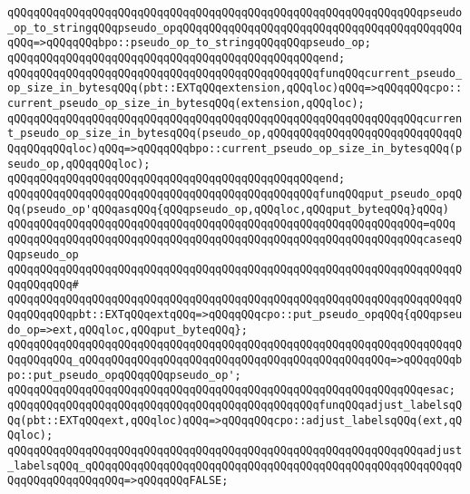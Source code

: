 \verb|qQQqqQQqqQQqqQQqqQQqqQQqqQQqqQQqqQQqqQQqqQQqqQQqqQQqqQQqqQQqqQQqpseudo_op_to_stringqQQqpseudo_opqQQqqQQqqQQqqQQqqQQqqQQqqQQqqQQqqQQqqQQqqQQqqQQq=>qQQqqQQqbpo::pseudo_op_to_stringqQQqqQQqpseudo_op;|\newline
\verb|qQQqqQQqqQQqqQQqqQQqqQQqqQQqqQQqqQQqqQQqqQQqqQQqend;|\newline
\newline
\verb|qQQqqQQqqQQqqQQqqQQqqQQqqQQqqQQqqQQqqQQqqQQqqQQqfunqQQqcurrent_pseudo_op_size_in_bytesqQQq(pbt::EXTqQQqextension,qQQqloc)qQQq=>qQQqqQQqcpo::current_pseudo_op_size_in_bytesqQQq(extension,qQQqloc);|\newline
\verb|qQQqqQQqqQQqqQQqqQQqqQQqqQQqqQQqqQQqqQQqqQQqqQQqqQQqqQQqqQQqqQQqcurrent_pseudo_op_size_in_bytesqQQq(pseudo_op,qQQqqQQqqQQqqQQqqQQqqQQqqQQqqQQqqQQqqQQqloc)qQQq=>qQQqqQQqbpo::current_pseudo_op_size_in_bytesqQQq(pseudo_op,qQQqqQQqloc);|\newline
\verb|qQQqqQQqqQQqqQQqqQQqqQQqqQQqqQQqqQQqqQQqqQQqqQQqend;|\newline
\newline
\verb|qQQqqQQqqQQqqQQqqQQqqQQqqQQqqQQqqQQqqQQqqQQqqQQqfunqQQqput_pseudo_opqQQq(pseudo_op'qQQqasqQQq{qQQqpseudo_op,qQQqloc,qQQqput_byteqQQq}qQQq)|\newline
\verb|qQQqqQQqqQQqqQQqqQQqqQQqqQQqqQQqqQQqqQQqqQQqqQQqqQQqqQQqqQQqqQQq=qQQq|\newline
\verb|qQQqqQQqqQQqqQQqqQQqqQQqqQQqqQQqqQQqqQQqqQQqqQQqqQQqqQQqqQQqqQQqcaseqQQqpseudo_op|\newline
\verb|qQQqqQQqqQQqqQQqqQQqqQQqqQQqqQQqqQQqqQQqqQQqqQQqqQQqqQQqqQQqqQQqqQQqqQQqqQQqqQQq#|\newline
\verb|qQQqqQQqqQQqqQQqqQQqqQQqqQQqqQQqqQQqqQQqqQQqqQQqqQQqqQQqqQQqqQQqqQQqqQQqqQQqqQQqpbt::EXTqQQqextqQQq=>qQQqqQQqcpo::put_pseudo_opqQQq{qQQqpseudo_op=>ext,qQQqloc,qQQqput_byteqQQq};|\newline
\verb|qQQqqQQqqQQqqQQqqQQqqQQqqQQqqQQqqQQqqQQqqQQqqQQqqQQqqQQqqQQqqQQqqQQqqQQqqQQqqQQq_qQQqqQQqqQQqqQQqqQQqqQQqqQQqqQQqqQQqqQQqqQQqqQQq=>qQQqqQQqbpo::put_pseudo_opqQQqqQQqpseudo_op';|\newline
\verb|qQQqqQQqqQQqqQQqqQQqqQQqqQQqqQQqqQQqqQQqqQQqqQQqqQQqqQQqqQQqqQQqesac;|\newline
\newline
\newline
\verb|qQQqqQQqqQQqqQQqqQQqqQQqqQQqqQQqqQQqqQQqqQQqqQQqfunqQQqadjust_labelsqQQq(pbt::EXTqQQqext,qQQqloc)qQQq=>qQQqqQQqcpo::adjust_labelsqQQq(ext,qQQqloc);|\newline
\verb|qQQqqQQqqQQqqQQqqQQqqQQqqQQqqQQqqQQqqQQqqQQqqQQqqQQqqQQqqQQqqQQqadjust_labelsqQQq_qQQqqQQqqQQqqQQqqQQqqQQqqQQqqQQqqQQqqQQqqQQqqQQqqQQqqQQqqQQqqQQqqQQqqQQqqQQq=>qQQqqQQqFALSE;|\newline
